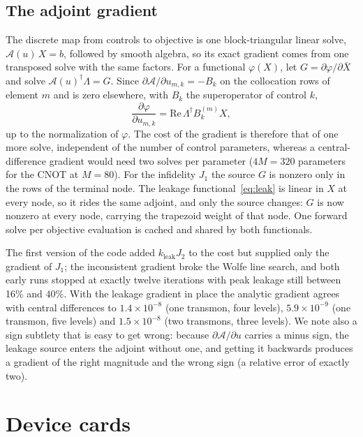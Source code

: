 \documentclass[10pt]{article}
\begin{document}
\subsection{The adjoint gradient}

The discrete map from controls to objective is one block-triangular linear
solve, $\mathcal A(u)\, X = b$, followed by smooth algebra, so its exact
gradient comes from one transposed solve with the same factors. For a
functional $\varphi(X)$, let $G = \partial\varphi/\partial \bar X$ and solve
$\mathcal A(u)^\dagger \Lambda = G$. Since $\partial \mathcal A/\partial
u_{m,k} = -B_k$ on the collocation rows of element $m$ and is zero elsewhere,
with $B_k$ the superoperator of control $k$,
\begin{equation}
  \frac{\partial \varphi}{\partial u_{m,k}}
   = \mathrm{Re}\, \Lambda^\dagger B_k^{(m)} X ,
  \label{eq:grad}
\end{equation}
up to the normalization of $\varphi$. The cost of the gradient is therefore
that of one more solve, independent of the number of control parameters,
whereas a central-difference gradient would need two solves per parameter
($4M = 320$ parameters for the CNOT at $M = 80$). For the infidelity $J_1$ the
source $G$ is nonzero only in the rows of the terminal node. The leakage
functional~\eqref{eq:leak} is linear in $X$ at every node, so it rides the same
adjoint, and only the source changes: $G$ is now nonzero at every node, carrying
the trapezoid weight of that node. One forward solve per objective evaluation
is cached and shared by both functionals.

The first version of the code added $k_{\mathrm{leak}} J_2$ to the cost but
supplied only the gradient of $J_1$; the inconsistent gradient broke the Wolfe
line search, and both early runs stopped at exactly twelve iterations with peak
leakage still between 16\% and 40\%. With the leakage gradient in place the
analytic gradient agrees with central differences to $1.4\times10^{-8}$ (one transmon, four levels),
$5.9\times10^{-9}$ (one transmon, five levels) and $1.5\times10^{-8}$ (two
transmons, three levels). We note also a sign subtlety that is easy to get
wrong: because $\partial\mathcal A/\partial u$ carries a minus sign, the leakage
source enters the adjoint without one, and getting it backwards produces a
gradient of the right magnitude and the wrong sign (a relative error of exactly
two).

\section{Device cards}
\label{sec:cards}
\end{document}
